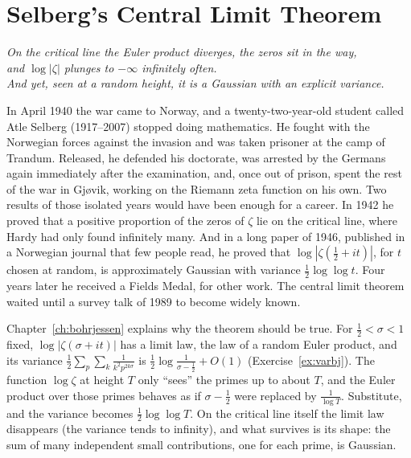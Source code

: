 \chapter{Selberg's Central Limit Theorem}\label{ch:selberg}
\begin{center}\itshape
On the critical line the Euler product diverges, the zeros sit in the way,\\
and $\log|\zeta|$ plunges to $-\infty$ infinitely often.\\
And yet, seen at a random height, it is a Gaussian with an explicit variance.
\end{center}

In April 1940 the war came to Norway, and a twenty-two-year-old student called Atle Selberg (1917--2007) stopped doing mathematics. He fought with the Norwegian forces against the invasion and was taken prisoner at the camp of Trandum. Released, he defended his doctorate, was arrested by the Germans again immediately after the examination, and, once out of prison, spent the rest of the war in Gj\o{}vik, working on the Riemann zeta function on his own. Two results of those isolated years would have been enough for a career. In 1942 he proved that a positive proportion of the zeros of $\zeta$ lie on the critical line, where Hardy had only found infinitely many. And in a long paper of 1946, published in a Norwegian journal that few people read, he proved that $\log|\zeta(\frac12+it)|$, for $t$ chosen at random, is approximately Gaussian with variance $\frac12\log\log t$. Four years later he received a Fields Medal, for other work. The central limit theorem waited until a survey talk of 1989 to become widely known.

Chapter~\ref{ch:bohrjessen} explains why the theorem should be true. For $\frac12<\sigma<1$ fixed, $\log|\zeta(\sigma+it)|$ has a limit law, the law of a random Euler product, and its variance $\frac12\sum_p\sum_k\frac1{k^2p^{2k\sigma}}$ is $\frac12\log\frac1{\sigma-\frac12}+O(1)$ (Exercise~\ref{ex:varbj}). The function $\log\zeta$ at height $T$ only ``sees'' the primes up to about $T$, and the Euler product over those primes behaves as if $\sigma-\frac12$ were replaced by $\frac1{\log T}$. Substitute, and the variance becomes $\frac12\log\log T$. On the critical line itself the limit law disappears (the variance tends to infinity), and what survives is its shape: the sum of many independent small contributions, one for each prime, is Gaussian.

